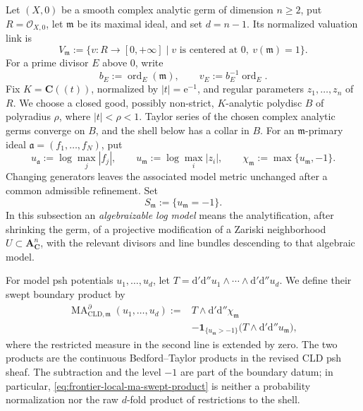\documentclass[11pt,a4paper]{article}
\theoremstyle{definition}
\theoremstyle{remark}
\newcommand{\rd}{\mathrm d}
\newcommand{\rme}{\mathrm e}
\newcommand{\dprime}{\rd'}
\newcommand{\ddprime}{\rd''}
\newcommand{\dprimeddprime}{\dprime\ddprime}
\newcommand{\one}{\mathbf 1}
\DeclareMathOperator{\ord}{ord}
\DeclareMathOperator{\MA}{MA}
\begin{document}
Let \((X,0)\) be a smooth complex analytic germ of dimension \(n\geq2\), put
\(R=\mathcal O_{X,0}\), let \(\mathfrak m\) be its maximal ideal, and set
\(d=n-1\).  Its normalized valuation link is
\begin{equation}
 V_{\mathfrak m}
 :=\{v:R\longrightarrow[0,+\infty]\mid
       v\text{ is centered at }0,\ v(\mathfrak m)=1\}.
 \label{eq:frontier-local-ma-link}
\end{equation}
For a prime divisor \(E\) above \(0\), write
\begin{equation}
 b_E:=\ord_E(\mathfrak m),
 \qquad v_E:=b_E^{-1}\ord_E.
 \label{eq:frontier-local-ma-divisorial-normalization}
\end{equation}
Fix \(K=\mathbf C((t))\), normalized by \(|t|=\rme^{-1}\), and regular
parameters \(z_1,\ldots,z_n\) of \(R\).  We choose a closed good, possibly
non-strict, \(K\)-analytic polydisc \(B\) of polyradius \(\rho\), where
\(|t|<\rho<1\).  Taylor series of the chosen complex analytic germs converge
on \(B\), and the shell below has a collar in \(B\).  For an
\(\mathfrak m\)-primary ideal
\(\mathfrak a=(f_1,\ldots,f_N)\), put
\begin{equation}
 u_{\mathfrak a}:=\log\max_j|f_j|,
 \qquad
 u_{\mathfrak m}:=\log\max_i|z_i|,
 \qquad
 \chi_{\mathfrak m}:=\max\{u_{\mathfrak m},-1\}.
 \label{eq:frontier-local-ma-model-functions}
\end{equation}
Changing generators leaves the associated model metric unchanged after a
common admissible refinement.  Set
\begin{equation}
S_{\mathfrak m}:=\{u_{\mathfrak m}=-1\}.
\label{eq:frontier-local-ma-shell}
\end{equation}
In this subsection an \emph{algebraizable log model} means the
analytification, after shrinking the germ, of a projective modification of a
Zariski neighborhood \(U\subset\mathbf A^n_{\mathbf C}\), with the relevant
divisors and line bundles descending to that algebraic model.

For model psh potentials \(u_1,\ldots,u_d\), let
\(T=\dprimeddprime u_1\wedge\cdots\wedge\dprimeddprime u_d\).  We define
their swept boundary product by
\begin{equation}
 \begin{split}
 \MA^{\partial}_{\mathrm{CLD},\mathfrak m}
       (u_1,\ldots,u_d)
 :={}&T\wedge\dprimeddprime\chi_{\mathfrak m}\\
 &-\one_{\{u_{\mathfrak m}>-1\}}
       \bigl(T\wedge\dprimeddprime u_{\mathfrak m}\bigr),
 \end{split}
 \label{eq:frontier-local-ma-swept-product}
\end{equation}
where the restricted measure in the second line is extended by zero.  The
two products are the continuous Bedford--Taylor products in the revised CLD
psh sheaf.  The subtraction and the level \(-1\) are part of the boundary
datum; in particular, \eqref{eq:frontier-local-ma-swept-product} is neither a
probability normalization nor the raw \(d\)-fold product of restrictions to
the shell.
\end{document}
